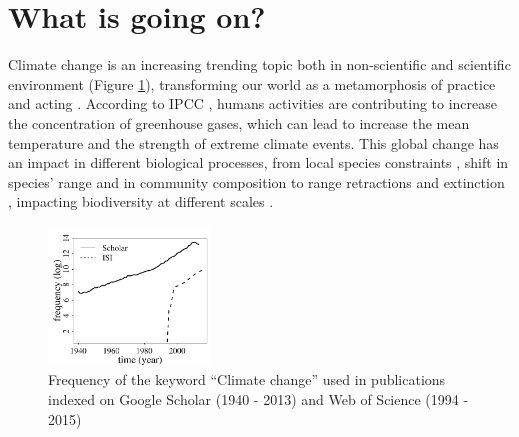 \section{What is going on?}

Climate change is an increasing trending topic both in non-scientific \parencite{Capstick2015} and scientific environment (Figure \ref{fig:fig1}), transforming our world as a metamorphosis of practice and acting \parencite{Beck2016}.
According to IPCC \parencite{Cubasch2013}, humans activities are contributing to increase the concentration of greenhouse gases, which can lead to increase the mean temperature and the strength of extreme climate events.
This global change has an impact in different biological processes, from local species constraints \parencite[e.g. low regeneration][]{Treyger2011}, shift in species' range \parencite{Boisvert-Marsh2014,Monleon2015} and in community composition \parencite{Dieleman2015} to range retractions and extinction \parencite{Thomas2006}, impacting biodiversity at different scales \parencite{Penuelas2013}.

\begin{figure}
    \centering
    \includegraphics[width=0.38\textwidth]{img/fig1_em.pdf}
    \caption{Frequency of the keyword ``Climate change'' used in publications indexed on Google Scholar (1940 - 2013) and Web of Science (1994 - 2015)}
    \label{fig:fig1}
\end{figure}


